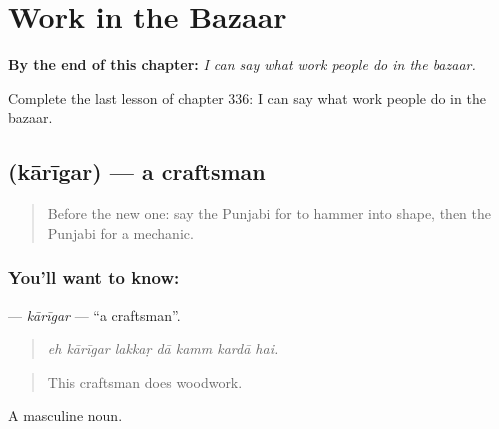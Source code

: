 
\chapter{Work in the Bazaar}
\label{ch:pa-a2-work-in-the-bazaar}

\begin{chapteropening}
\textbf{By the end of this chapter:} \emph{I can say what work people do in the bazaar.}

Complete the last lesson of chapter 336: I can say what work people do in the bazaar.
\end{chapteropening}

\section[\texorpdfstring{\pa{ਕਾਰੀਗਰ} (kārīgar)}{ਕਾਰੀਗਰ (kārīgar)}]{ (kārīgar) — a craftsman}

\label{lesson:PA-C336-karigar}



\begin{quote}
Before the new one: say the Punjabi for to hammer into shape, then the Punjabi for a mechanic.
\end{quote}

\subsection*{You'll want to know: }
\textbf{} — \emph{kārīgar} — \textquotedblleft{}a craftsman\textquotedblright{}.

\begin{quote}
      
\end{quote}

\begin{quote}
\emph{eh kārīgar lakkaṛ dā kamm kardā hai.}
\end{quote}

\begin{quote}
This craftsman does woodwork.
\end{quote}

A masculine noun.

